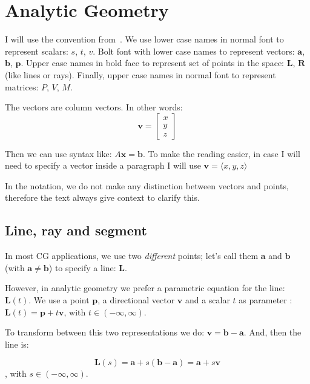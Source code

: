 \section{Analytic Geometry}
\label{sec:analyticGeo}

I will use the convention from~\cite{Buss2003}.
We use lower case names in normal font to represent scalars: $s$, $t$, $v$.
Bolt font with lower case names to represent vectors: $\mathbf{a}$, $\mathbf{b}$, $\mathbf{p}$.
Upper case names in bold face to represent set of points in the space: $\mathbf{L}$, $\mathbf{R}$ (like lines or rays).
Finally, upper case names in normal font to represent matrices: $P$, $V$, $M$.

The vectors are column vectors. In other words:
$$ \mathbf{v} = \begin{bmatrix}
  x \\ 
  y \\
  z
 \end{bmatrix} $$

Then we can use syntax like: $A \mathbf{x} = \mathbf{b}$.
To make the reading easier, in case I will need to specify a vector inside a paragraph I will use $\mathbf{v} = \langle x, y, z \rangle$

In the notation, we do not make any distinction between vectors and points, therefore the text always give context to clarify this. 

\subsection{Line, ray and segment}
\label{sec:linedef}

In most CG applications, we use two \emph{different} points; let's call them $\mathbf{a}$ and $\mathbf{b}$ (with $\mathbf{a} \neq \mathbf{b}$) to specify a line: $\mathbf{L}$. 

However, in analytic geometry we prefer a parametric equation for the line: $\mathbf{L}(t)$.
We use a point $\mathbf{p}$, a directional vector $\mathbf{v}$ and a scalar $t$ as parameter : $\mathbf{L}(t) = \mathbf{p} + t \mathbf{v}$, with $t \in (-\infty, \infty)$.

To transform between this two representations we do: $\mathbf{v} = \mathbf{b} -\mathbf{a}$. And, then the line is: 

\begin{equation}
\mathbf{L}(s) = \mathbf{a} + s (\mathbf{b} -\mathbf{a}) = \mathbf{a} + s \mathbf{v} 
\label{eq:line}
\end{equation}
, with $s \in (-\infty, \infty)$. 

